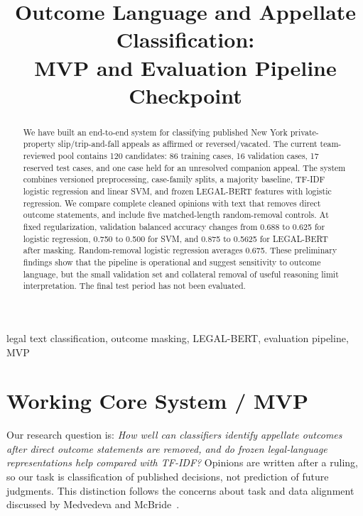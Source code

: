 \documentclass[conference]{IEEEtran}
\begin{document}
\title{Outcome Language and Appellate Classification:\\MVP and Evaluation Pipeline Checkpoint}
\author{
}
\maketitle

\begin{abstract}
We have built an end-to-end system for classifying published New York private-property slip/trip-and-fall appeals as affirmed or reversed/vacated. The current team-reviewed pool contains 120 candidates: 86 training cases, 16 validation cases, 17 reserved test cases, and one case held for an unresolved companion appeal. The system combines versioned preprocessing, case-family splits, a majority baseline, TF-IDF logistic regression and linear SVM, and frozen LEGAL-BERT features with logistic regression. We compare complete cleaned opinions with text that removes direct outcome statements, and include five matched-length random-removal controls. At fixed regularization, validation balanced accuracy changes from 0.688 to 0.625 for logistic regression, 0.750 to 0.500 for SVM, and 0.875 to 0.5625 for LEGAL-BERT after masking. Random-removal logistic regression averages 0.675. These preliminary findings show that the pipeline is operational and suggest sensitivity to outcome language, but the small validation set and collateral removal of useful reasoning limit interpretation. The final test period has not been evaluated.
\end{abstract}
\begin{IEEEkeywords}
legal text classification, outcome masking, LEGAL-BERT, evaluation pipeline, MVP
\end{IEEEkeywords}

\section{Working Core System / MVP}
Our research question is: \emph{How well can classifiers identify appellate outcomes after direct outcome statements are removed, and do frozen legal-language representations help compared with TF-IDF?} Opinions are written after a ruling, so our task is classification of published decisions, not prediction of future judgments. This distinction follows the concerns about task and data alignment discussed by Medvedeva and McBride~\cite{medvedeva}.
\end{document}
